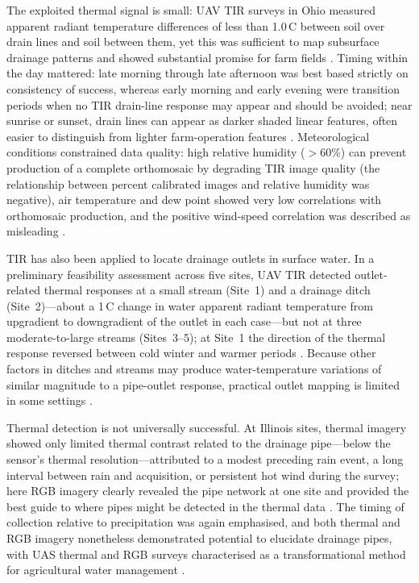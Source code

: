 The exploited thermal signal is small: UAV TIR surveys in Ohio measured apparent radiant temperature differences of less than 1.0\,\textdegree C between soil over drain lines and soil between them, yet this was sufficient to map subsurface drainage patterns and showed substantial promise for farm fields \parencite{Allred2021}. Timing within the day mattered: late morning through late afternoon was best based strictly on consistency of success, whereas early morning and early evening were transition periods when no TIR drain-line response may appear and should be avoided; near sunrise or sunset, drain lines can appear as darker shaded linear features, often easier to distinguish from lighter farm-operation features \parencite{Allred2021}. Meteorological conditions constrained data quality: high relative humidity ($>$60\%) can prevent production of a complete orthomosaic by degrading TIR image quality (the relationship between percent calibrated images and relative humidity was negative), air temperature and dew point showed very low correlations with orthomosaic production, and the positive wind-speed correlation was described as misleading \parencite{Allred2021}.

TIR has also been applied to locate drainage outlets in surface water. In a preliminary feasibility assessment across five sites, UAV TIR detected outlet-related thermal responses at a small stream (Site~1) and a drainage ditch (Site~2)---about a 1\,\textdegree C change in water apparent radiant temperature from upgradient to downgradient of the outlet in each case---but not at three moderate-to-large streams (Sites~3--5); at Site~1 the direction of the thermal response reversed between cold winter and warmer periods \parencite{Allred2022}. Because other factors in ditches and streams may produce water-temperature variations of similar magnitude to a pipe-outlet response, practical outlet mapping is limited in some settings \parencite{Allred2022}.

Thermal detection is not universally successful. At Illinois sites, thermal imagery showed only limited thermal contrast related to the drainage pipe---below the sensor's thermal resolution---attributed to a modest preceding rain event, a long interval between rain and acquisition, or persistent hot wind during the survey; here RGB imagery clearly revealed the pipe network at one site and provided the best guide to where pipes might be detected in the thermal data \parencite{Kratt2020}. The timing of collection relative to precipitation was again emphasised, and both thermal and RGB imagery nonetheless demonstrated potential to elucidate drainage pipes, with UAS thermal and RGB surveys characterised as a transformational method for agricultural water management \parencite{Kratt2020}.

